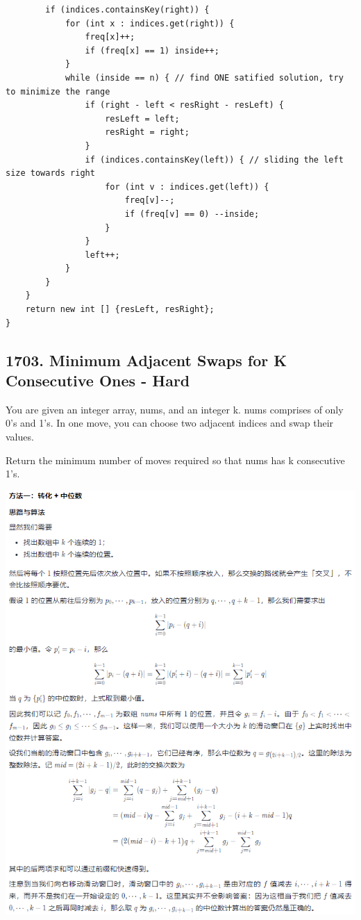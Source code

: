 \documentclass[9pt, b5paaper]{book}
\begin{document}
\begin{enumerate}
\begin{verbatim}
        if (indices.containsKey(right)) {
            for (int x : indices.get(right)) {
                freq[x]++;
                if (freq[x] == 1) inside++;
            }
            while (inside == n) { // find ONE satified solution, try to minimize the range
                if (right - left < resRight - resLeft) {
                    resLeft = left;
                    resRight = right;
                }
                if (indices.containsKey(left)) { // sliding the left size towards right
                    for (int v : indices.get(left)) {
                        freq[v]--;
                        if (freq[v] == 0) --inside;
                    }
                }
                left++;
            }
        }
    }
    return new int [] {resLeft, resRight};
}
\end{verbatim}
\end{enumerate}

\subsection{1703. Minimum Adjacent Swaps for K Consecutive Ones - Hard}
\label{sec-5-0-7}
You are given an integer array, nums, and an integer k. nums comprises of only 0's and 1's. In one move, you can choose two adjacent indices and swap their values.

Return the minimum number of moves required so that nums has k consecutive 1's.

\includegraphics[width=.9\linewidth]{./pic/median.png}
\end{document}

